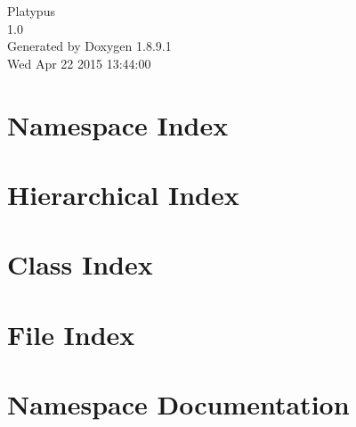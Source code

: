 \documentclass[twoside]{book}
\newcommand{\+}{\discretionary{\mbox{\scriptsize$\hookleftarrow$}}{}{}}
\newcommand{\clearemptydoublepage}{%
  \newpage{\pagestyle{empty}\cleardoublepage}%
}
\begin{document}
\begin{titlepage}
\vspace*{7cm}
\begin{center}%
{\Large Platypus \\[1ex]\large 1.\+0 }\\
\vspace*{1cm}
{\large Generated by Doxygen 1.8.9.1}\\
\vspace*{0.5cm}
{\small Wed Apr 22 2015 13:44:00}\\
\end{center}
\end{titlepage}
\clearemptydoublepage
\tableofcontents
\clearemptydoublepage
{}

\chapter{Namespace Index}

\chapter{Hierarchical Index}

\chapter{Class Index}

\chapter{File Index}

\chapter{Namespace Documentation}

























\end{document}
